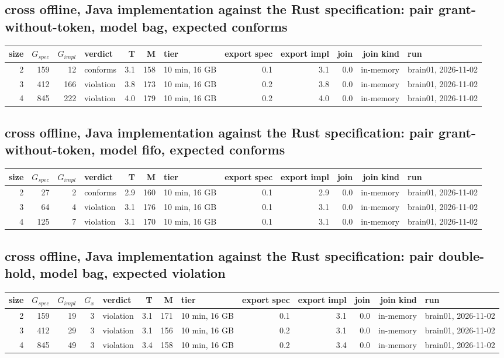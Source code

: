 \documentclass[10pt]{article}
\begin{document}
\subsection*{cross offline, Java implementation against the Rust specification: pair \textsf{grant-without-token}, model bag, expected conforms}
\begin{longtable}{@{}rrrlrrlrrrrl@{}}
\toprule
size & $G_{\mathit{spec}}$ & $G_{\mathit{impl}}$ & verdict & T & M & tier & export spec & export impl & join & join kind & run \\
\midrule
\endhead
\color{red} 2 & 159 & 12 & conforms & 3.1 & 158 & 10 min, 16 GB & 0.1 & 3.1 & 0.0 & in-memory & brain01, 2026-11-02 \\
\color{red} 3 & 412 & 166 & violation & 3.8 & 173 & 10 min, 16 GB & 0.2 & 3.8 & 0.0 & in-memory & brain01, 2026-11-02 \\
\color{red} 4 & 845 & 222 & violation & 4.0 & 179 & 10 min, 16 GB & 0.2 & 4.0 & 0.0 & in-memory & brain01, 2026-11-02 \\
\bottomrule
\end{longtable}
\subsection*{cross offline, Java implementation against the Rust specification: pair \textsf{grant-without-token}, model fifo, expected conforms}
\begin{longtable}{@{}rrrlrrlrrrrl@{}}
\toprule
size & $G_{\mathit{spec}}$ & $G_{\mathit{impl}}$ & verdict & T & M & tier & export spec & export impl & join & join kind & run \\
\midrule
\endhead
\color{red} 2 & 27 & 2 & conforms & 2.9 & 160 & 10 min, 16 GB & 0.1 & 2.9 & 0.0 & in-memory & brain01, 2026-11-02 \\
\color{red} 3 & 64 & 4 & violation & 3.1 & 176 & 10 min, 16 GB & 0.1 & 3.1 & 0.0 & in-memory & brain01, 2026-11-02 \\
\color{red} 4 & 125 & 7 & violation & 3.1 & 170 & 10 min, 16 GB & 0.1 & 3.1 & 0.0 & in-memory & brain01, 2026-11-02 \\
\bottomrule
\end{longtable}
\subsection*{cross offline, Java implementation against the Rust specification: pair \textsf{double-hold}, model bag, expected violation}
\begin{longtable}{@{}rrrrlrrlrrrrl@{}}
\toprule
size & $G_{\mathit{spec}}$ & $G_{\mathit{impl}}$ & $G_x$ & verdict & T & M & tier & export spec & export impl & join & join kind & run \\
\midrule
\endhead
\color{red} 2 & 159 & 19 & 3 & violation & 3.1 & 171 & 10 min, 16 GB & 0.1 & 3.1 & 0.0 & in-memory & brain01, 2026-11-02 \\
\color{red} 3 & 412 & 29 & 3 & violation & 3.1 & 156 & 10 min, 16 GB & 0.2 & 3.1 & 0.0 & in-memory & brain01, 2026-11-02 \\
\color{red} 4 & 845 & 49 & 3 & violation & 3.4 & 158 & 10 min, 16 GB & 0.2 & 3.4 & 0.0 & in-memory & brain01, 2026-11-02 \\
\bottomrule
\end{longtable}
\end{document}
